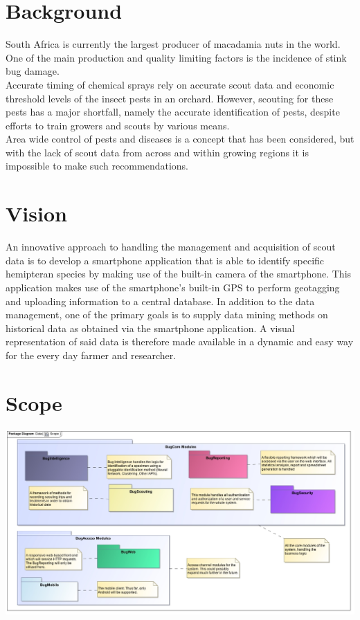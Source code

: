 \documentclass[11pt,a4paper,titlepage]{article}
\begin{document}

\tableofcontents

\pagebreak


\pagebreak


\section{Background}
South Africa is currently the largest producer of macadamia nuts in the world. One of the main production and quality limiting factors is the incidence of stink bug damage. 
\\Accurate timing of chemical sprays rely on accurate scout data and economic threshold levels of the insect pests in an orchard. However, scouting for these pests has
a major shortfall, namely the accurate identification of pests, despite efforts to train growers and scouts by various means.\\
Area wide control of pests and diseases is a concept that has been considered, but with the lack of scout data from across and within growing regions it is impossible to make such recommendations. \\

\section{Vision}
An innovative approach to handling the management and acquisition of scout data is to develop a smartphone application that is able to identify specific hemipteran species by making use of the built-in camera of the smartphone. This application makes use of the smartphone’s built-in GPS to perform geotagging and uploading information to a central database. In addition to the data management, one of the primary goals is to supply data mining methods on historical data as obtained via the smartphone application. A visual representation of said data is therefore made available in a dynamic and easy way for the every day farmer and researcher.

\section{Scope}
\includegraphics[width=\linewidth]{scope}
\end{document}
